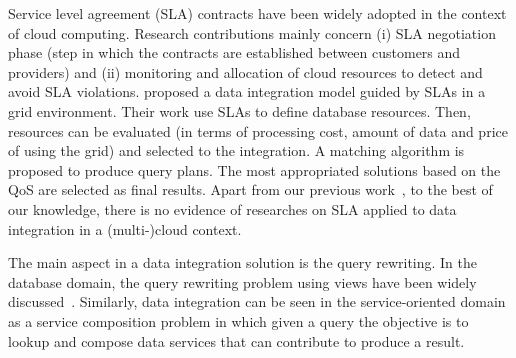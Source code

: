 Service level agreement (SLA) contracts have been widely adopted in the context of cloud computing. Research contributions mainly concern (i) SLA negotiation phase (step in which the contracts are established between customers and providers) and (ii) monitoring and allocation of cloud resources to detect and avoid SLA violations.
\cite{Nie07} proposed a data integration model guided by SLAs in a grid environment. Their work use SLAs to define database resources. Then, resources can be evaluated (in terms of processing cost, amount of data and price of using the grid) and selected to the integration. A matching algorithm is proposed to produce query plans. The most appropriated solutions based on the QoS are selected as final results. Apart from our previous work~\cite{Bennani2014}, to the best of our knowledge, there is no evidence of researches on SLA applied to data integration in a (multi-)cloud context.


The main aspect in a data integration solution is the query rewriting. In the database domain, the query rewriting problem using views have been widely discussed~\cite{Halevy:2001,Levy:1996,Duschka:1997,Pottinger:2001}.
Similarly, data integration can be seen in the service-oriented domain as a service composition problem in which given a query the objective is to lookup and compose data services that can contribute to produce a result.
%

